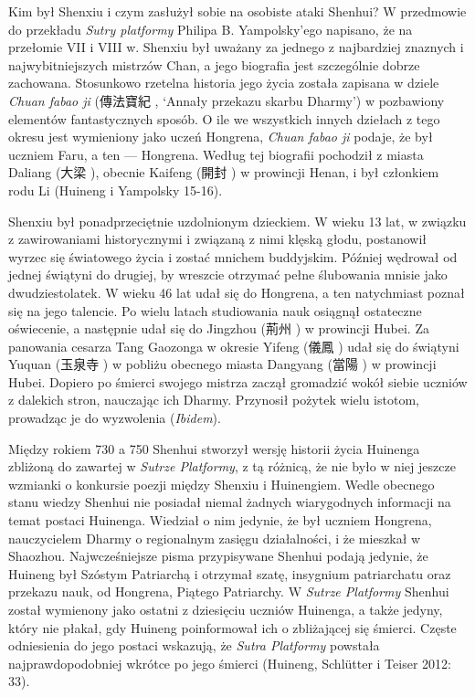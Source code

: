 Kim był Shenxiu i czym zasłużył sobie na osobiste ataki Shenhui? W przedmowie do przekładu \textit{Sutry platformy} Philipa B. Yampolsky'ego napisano, że na przełomie VII i VIII w. Shenxiu był uważany za jednego z najbardziej znaznych i najwybitniejszych mistrzów Chan, a jego biografia jest szczególnie dobrze zachowana. Stosunkowo rzetelna historia jego życia została zapisana w dziele \textit{Chuan fabao ji} (傳法寶紀 , `Annały przekazu skarbu Dharmy') w pozbawiony elementów fantastycznych sposób. O ile we wszystkich innych dziełach z tego okresu jest wymieniony jako uczeń Hongrena, \textit{Chuan fabao ji} podaje, że był uczniem Faru, a ten --- Hongrena. Według tej biografii pochodził z miasta Daliang (大梁 ), obecnie Kaifeng (開封 ) w prowincji Henan, i był członkiem rodu Li (Huineng i Yampolsky 15-16). %

Shenxiu był ponadprzeciętnie uzdolnionym dzieckiem. W wieku 13 lat, w związku z zawirowaniami historycznymi i związaną z nimi klęską głodu, postanowił wyrzec się światowego życia i zostać mnichem buddyjskim. Później wędrował od jednej świątyni do drugiej, by wreszcie otrzymać pełne ślubowania mnisie jako dwudziestolatek. W wieku 46 lat udał się do Hongrena, a ten natychmiast poznał się na jego talencie. Po wielu latach studiowania nauk osiągnął ostateczne oświecenie, a następnie udał się do Jingzhou (荊州 ) w prowincji Hubei. Za panowania cesarza Tang Gaozonga w okresie Yifeng (儀鳳 ) udał się do świątyni Yuquan (玉泉寺 ) w pobliżu obecnego miasta Dangyang (當陽 ) w prowincji Hubei. Dopiero po śmierci swojego mistrza zaczął gromadzić wokół siebie uczniów z dalekich stron, nauczając ich Dharmy. Przynosił pożytek wielu istotom, prowadząc je do wyzwolenia (\textit{Ibidem}). %

Między rokiem 730 a 750 Shenhui stworzył wersję historii życia Huinenga zbliżoną do zawartej w \textit{Sutrze Platformy}, z tą różnicą, że nie było w niej jeszcze wzmianki o konkursie poezji między Shenxiu i Huinengiem. Wedle obecnego stanu wiedzy Shenhui nie posiadał niemal żadnych wiarygodnych informacji na temat postaci Huinenga. Wiedział o nim jedynie, że był uczniem Hongrena, nauczycielem Dharmy o regionalnym zasięgu działalności, i że mieszkał w Shaozhou. Najwcześniejsze pisma przypisywane Shenhui podają jedynie, że Huineng był Szóstym Patriarchą i otrzymał szatę, insygnium patriarchatu oraz przekazu nauk, od Hongrena, Piątego Patriarchy. W \textit{Sutrze Platformy} Shenhui został wymienony jako ostatni z dziesięciu uczniów Huinenga, a także jedyny, który nie płakał, gdy Huineng poinformował ich o zbliżającej się śmierci. Częste odniesienia do jego postaci wskazują, że \textit{Sutra Platformy} powstała najprawdopodobniej wkrótce po jego śmierci
(Huineng, Schlütter i Teiser 2012: 33).


